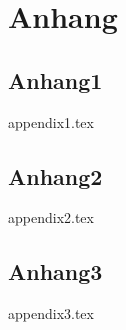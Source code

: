 \chapter{Anhang}

\section{Anhang1}
{appendix1.tex}

\section{Anhang2}
{appendix2.tex}

\section{Anhang3}
{appendix3.tex}
